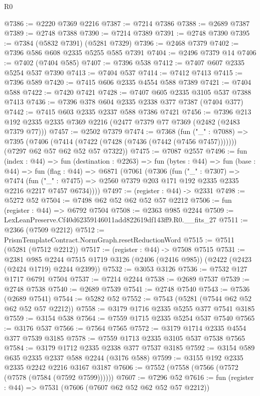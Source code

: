 \begin{lexlean}{R0}
\begin{coremodule}
@7386 := @2220 @7369 @2216
@7387 := @7214 @7386
@7388 := @2689 @7387
@7389 := @2748 @7388
@7390 := @7214 @7389
@7391 := @2748 @7390
@7395 := @7384 (@5832 @7391) (@5281 @7329)
@7396 := @2468 @7379
@7402 := @7396 @586 @608 @2335 @5255 @585 @7391
@7404 := @2496 @7379 @14
@7406 := @7402 (@7404 @585)
@7407 := @7396 @538
@7412 := @7407 @607 @2335 @5254 @537 @7390
@7413 := @7404 @537
@7414 := @7412 @7413
@7415 := @7396 @589
@7420 := @7415 @606 @2335 @4554 @588 @7389
@7421 := @7404 @588
@7422 := @7420 @7421
@7428 := @7407 @605 @2335 @3105 @537 @7388 @7413
@7436 := @7396 @378 @604 @2335 @2338 @377 @7387 (@7404 @377)
@7442 := @7415 @603 @2335 @2337 @588 @7386 @7421
@7456 := @7396 @213 @192 @2335 @2335 @7369 @2216 (@2477 @7379 @77 @7369 (@2482 (@2483 @7379 @77)))
@7457 := @2502 @7379
@7474 := @7368
    (fun ("_" : @7088) =>
    @7395
      (@7406 (@7414 (@7422 (@7428 (@7436 (@7442 (@7456 @7457)))))))
      (@7297 @62 @57 @62 @52 @57 @7322))
@7475 := @7087 @2557
@7496 := fun (index : @44) =>
  fun (destination : @2263) =>
  fun (bytes : @44) =>
  fun (base : @44) =>
  fun (flag : @44) =>
  @6871
    (@7061
      (@7306
        (fun ("_" : @7307) =>
        @7474
          (fun ("_" : @7475) => @2560 @7379 @203 @171 @192 @2335 @2335 @2216 @2217 @7457 @6734))))
@7497 := (register : @44) -> @2331
@7498 := @5272 @52
@7504 := @7498 @62 @52 @62 @52 @57 @2212
@7506 := fun (register : @44) => @6792 @7504
@7508 := @2363 @985 @2244
@7509 := LexLeanPreserve.Cf40d62359146011add822619df143ff9.R0.__fits_27
@7511 := @2366 (@7509 @2212)
@7512 := PrismTemplateContract.NormGraph.resetReductionWord
@7515 := @7511 (@5281 (@7512 @2212))
@7517 := (register : @44) -> @7508 @7515
@7531 := @2381
    @985
    @2244
    @7515
    @1719
    @3126
    (@2406 (@2416 @985))
    (@2422 (@2423 (@2424 @1719) @2244 @2399))
@7532 := @3053 @3126
@7536 := @7532 @127 @1717 @6791 @7504
@7537 := @7214 @2244
@7538 := @2689 @7537
@7539 := @2748 @7538
@7540 := @2689 @7539
@7541 := @2748 @7540
@7543 := @7536 (@2689 @7541)
@7544 := @5282 @52
@7552 := @7543 (@5281 (@7544 @62 @52 @62 @52 @57 @2212))
@7558 := @3179 @1716 @2335 @5255 @377 @7541 @3185
@7559 := @3154 @538
@7564 := @7559 @1715 @2335 @5254 @537 @7540
@7565 := @3176 @537
@7566 := @7564 @7565
@7572 := @3179 @1714 @2335 @4554 @377 @7539 @3185
@7578 := @7559 @1713 @2335 @3105 @537 @7538 @7565
@7584 := @3179 @1712 @2335 @2338 @377 @7537 @3185
@7592 := @3154 @589 @635 @2335 @2337 @588 @2244 (@3176 @588)
@7599 := @3155 @192 @2335 @2335 @2242 @2216 @3167 @3187
@7606 := @7552 (@7558 (@7566 (@7572 (@7578 (@7584 (@7592 @7599))))))
@7607 := @7296 @52
@7616 := fun (register : @44) => @7531 (@7606 (@7607 @62 @52 @62 @52 @57 @2212))

\end{coremodule}
\end{lexlean}
